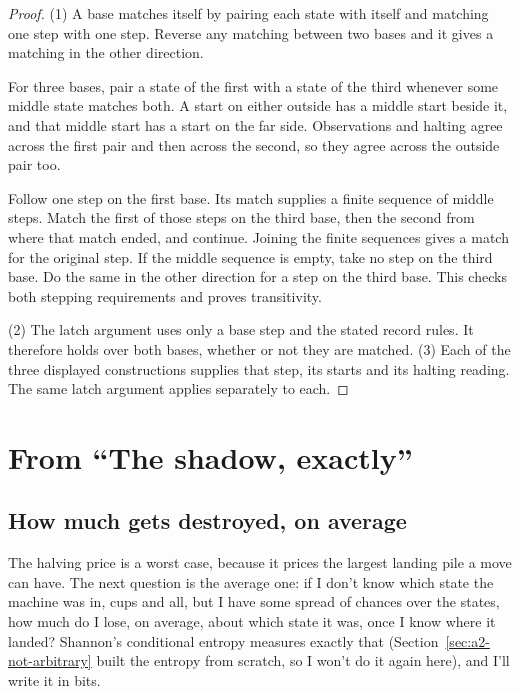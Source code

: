 \documentclass[11pt,twoside]{article}
\theoremstyle{thielethm}
\theoremstyle{thieledef}
\theoremstyle{thieledef}
\theoremstyle{thieledef}
\theoremstyle{thielethm}
\theoremstyle{thieleobs}
\theoremstyle{thielethm}
\begin{document}
\begin{proof}
(1) A base matches itself by pairing each state with itself and matching one
step with one step. Reverse any matching between two bases and it gives a
matching in the other direction.

For three bases, pair a state of the first with a state of the third whenever
some middle state matches both. A start on either outside has a middle start
beside it, and that middle start has a start on the far side. Observations
and halting agree across the first pair and then across the second, so they
agree across the outside pair too.

Follow one step on the first base. Its match supplies a finite sequence of
middle steps. Match the first of those steps on the third base, then the
second from where that match ended, and continue. Joining the finite
sequences gives a match for the original step. If the middle sequence is
empty, take no step on the third base. Do the same in the other direction
for a step on the third base. This checks both stepping requirements and
proves transitivity.

(2) The latch argument uses only a base step and the stated record rules.
It therefore holds over both bases, whether or not they are matched.
(3) Each of the three displayed constructions supplies that step, its starts
and its halting reading. The same latch argument applies separately to each.
\end{proof}


\section{From ``The shadow, exactly''}
\subsection{How much gets destroyed, on average}

The halving price is a worst case, because it prices the largest landing pile a move can have. The next question is
the average one: if I don't know which state the machine was in, cups and all, but I have some
spread of chances over the states, how much do I lose, on average, about which state it was, once
I know where it landed? Shannon's conditional entropy measures exactly that (Section~\ref{sec:a2-not-arbitrary}
built the entropy from scratch, so I won't do it again here), and I'll write it in bits.
\end{document}
